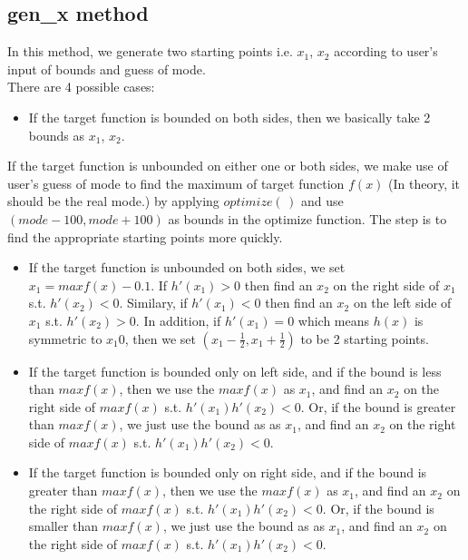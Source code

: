 \documentclass[11pt, oneside]{article}   	%
\begin{document}
\subsection*{ gen\_x method }
In this method, we generate two starting points i.e. $x_{1}$, $x_{2}$ according to user's input of bounds and guess of mode. \\
There are 4 possible cases:
  \begin{itemize}
  \item  If the target function is bounded on both sides, then we basically take 2 bounds as $x_{1}$, $x_{2}$.
 \end{itemize}
If the target function is unbounded on either one or both sides, we make use of user's guess of mode to find the maximum of target function $f(x)$ (In theory, it should be the real mode.) by applying $optimize(\,)$ and use $(mode-100, mode+100)$ as bounds in the optimize function. The step is to find the appropriate starting points more quickly.


 \begin{itemize}

  \item  If the target function is unbounded on both sides,  we set $x_{1}=maxf(x)-0.1$. If $h'(x_{1})>0$ then find an $x_{2}$ on the right side of $x_{1}$ s.t. $h'(x_{2})<0$. Similary, if $h'(x_{1})<0$ then find an $x_{2}$ on the left side of $x_{1}$ s.t. $h'(x_{2})>0$. In addition, if $h'(x_{1})=0$ which means $h(x)$ is symmetric to $x_{1}0$, then we set $(x_{1}-\frac{1}{2},x_{1}+\frac{1}{2})$ to be 2 starting points.


  \item  If the target function is bounded only on left side,  and if the bound is less than $maxf(x)$, then we use the $maxf(x)$ as $x_{1}$, and find an $x_{2}$ on the right side of $maxf(x)$ s.t. $h'(x_{1})h'(x_{2})<0$. Or, if the bound is greater than $maxf(x)$, we just use the bound as as $x_{1}$, and find an $x_{2}$ on the right side of $maxf(x)$ s.t. $h'(x_{1})h'(x_{2})<0$.

  \item  If the target function is bounded only on right side,  and if the bound is greater than $maxf(x)$, then we use the $maxf(x)$ as $x_{1}$, and find an $x_{2}$ on the right side of $maxf(x)$ s.t. $h'(x_{1})h'(x_{2})<0$. Or, if the bound is smaller than $maxf(x)$, we just use the bound as as $x_{1}$, and find an $x_{2}$ on the right side of $maxf(x)$ s.t. $h'(x_{1})h'(x_{2})<0$.

 \end{itemize}
\end{document}

